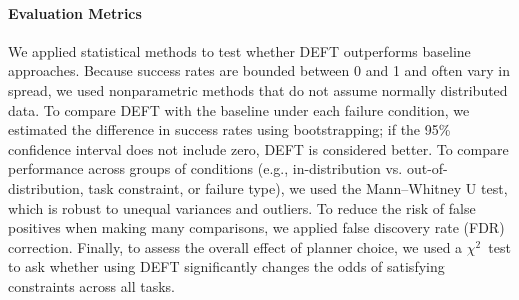 \paragraph{Evaluation Metrics}
We applied statistical methods to test whether DEFT outperforms baseline approaches. Because success rates are bounded between 0 and 1 and often vary in spread, we used nonparametric methods that do not assume normally distributed data. To compare DEFT with the baseline under each failure condition, we estimated the difference in success rates using bootstrapping; if the 95\% confidence interval does not include zero, DEFT is considered better. To compare performance across groups of conditions (e.g., in-distribution vs. out-of-distribution, task constraint, or failure type), we used the Mann–Whitney U test, which is robust to unequal variances and outliers. To reduce the risk of false positives when making many comparisons, we applied false discovery rate (FDR) correction. Finally, to assess the overall effect of planner choice, we used a \(\chi^2\)\ test to ask whether using DEFT significantly changes the odds of satisfying constraints across all tasks.




